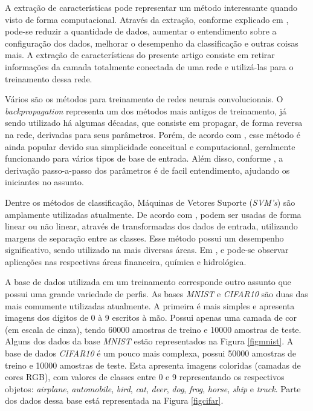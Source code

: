 \documentclass[conference]{IEEEtran}
\begin{document}
A extração de características pode representar um método interessante quando visto de forma computacional. Através da extração, conforme explicado em \cite{ftguyon}, pode-se reduzir a quantidade de dados, aumentar o entendimento sobre a configuração dos dados, melhorar o desempenho da classificação e outras coisas mais. A extração de características do presente artigo consiste em retirar informações da camada totalmente conectada de uma rede e utilizá-las para o treinamento dessa rede.

Vários são os métodos para treinamento de redes neurais convolucionais. O \textit{backpropagation} representa um dos métodos mais antigos de treinamento, já sendo utilizado há algumas décadas, que consiste em propagar, de forma reversa na rede, derivadas para seus parâmetros. Porém, de acordo com \cite{bplecun}, esse método é ainda popular devido sua simplicidade conceitual e computacional, geralmente funcionando para vários tipos de base de entrada. Além disso, conforme \cite{bpzhang}, a derivação passo-a-passo dos parâmetros é de facil entendimento, ajudando os iniciantes no assunto.

Dentre os métodos de classificação, Máquinas de Vetores Suporte (\textit{SVM's}) são amplamente utilizadas atualmente. De acordo com \cite{svmwang}, podem ser usadas de forma linear ou não linear, através de transformadas dos dados de entrada, utilizando margens de separação entre as classes. Esse método possui um desempenho significativo, sendo utilizado na mais diversas áreas. Em \cite{svmfinanc}, \cite{svmchem}  e \cite{svmhydro} pode-se observar aplicações nas respectivas áreas financeira, química e hidrológica.

A base de dados utilizada em um treinamento corresponde outro assunto que possui uma grande variedade de perfis. As bases \textit{MNIST} e \textit{CIFAR10} são duas das mais comumente utilizadas atualmente. A primeira é mais simples e apresenta imagens dos dígitos de 0 à 9 escritos à mão. Possui apenas uma camada de cor (em escala de cinza), tendo 60000 amostras de treino e 10000 amostras de teste. Alguns dos dados da base \textit{MNIST} estão representados na Figura \ref{figmnist}. A base de dados \textit{CIFAR10} é um pouco mais complexa, possui 50000 amostras de treino e 10000 amostras de teste. Esta apresenta imagens coloridas (camadas de cores RGB), com valores de classes entre 0 e 9 representando os respectivos objetos: \textit{airplane}, \textit{automobile}, \textit{bird}, \textit{cat}, \textit{deer}, \textit{dog}, \textit{frog}, \textit{horse}, \textit{ship} e \textit{truck}. Parte dos dados dessa base está representada na Figura \ref{figcifar}.
\end{document}
